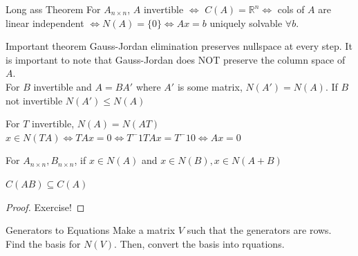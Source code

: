 \documentclass[11pt]{article}
\begin{document}
\begin{theorembox}{Long ass Theorem}
    For $A_{n \times n}$, $A$ invertible $\iff$ $C(A)=\mathbb{R}^n \iff$ cols of $A$ are linear
    independent $\iff N(A)=\{0\} \iff Ax=b$ uniquely solvable $\forall b$.
\end{theorembox}

\begin{theorembox}{Important theorem}
    Gauss-Jordan elimination preserves nullspace at every step. It is important to note that
    Gauss-Jordan does NOT preserve the column space of $A$. \\
    For $B$ invertible and $A=BA'$ where
    $A'$ is some matrix, $N(A')=N(A)$. If $B$ not invertible $N(A') \leq N(A)$
\end{theorembox}

\begin{theorembox}{}
    For $T$ invertible, $N(A)=N(AT)$ \\
    $x \in N(TA) \iff TAx=0 \iff T^-1 T Ax = T^-1 0 \iff Ax=0$
\end{theorembox}

\begin{theorembox}{}
    For $A_{n \times n}, B_{n \times n}$, if $x \in N(A)$ and $x \in N(B), x \in N(A+B)$
\end{theorembox}

\begin{theorembox}{}
    $C(AB) \subseteq C(A)$
\end{theorembox}
\begin{proof}
    Exercise!   
\end{proof}

\begin{definitionbox}{Generators to Equations}
    Make a matrix $V$ such that the generators are rows. Find the basis for $N(V)$. Then, convert the
    basis into rquations.
\end{definitionbox}
\end{document}
